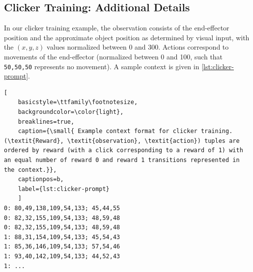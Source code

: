 \documentclass{article}
\renewcommand{\tt}[1]{{\texttt{#1}}}
\begin{document}
\subsection{Clicker Training: Additional Details}
In our clicker training example, the observation consists of the end-effector position and the approximate object position as determined by visual input, with the $(x,y,z)$ values normalized between 0 and 300. Actions correspond to movements of the end-effector (normalized between 0 and 100, such that \tt{50,50,50} represents no movement). A sample context is given in \cref{lst:clicker-prompt}.
\begin{lstlisting}[
    basicstyle=\ttfamily\footnotesize,
    backgroundcolor=\color{light},
    breaklines=true,
    caption={\small{ Example context format for clicker training. (\textit{Reward}, \textit{observation}, \textit{action}) tuples are ordered by reward (with a click corresponding to a reward of 1) with an equal number of reward 0 and reward 1 transitions represented in the context.}},
    captionpos=b,
    label={lst:clicker-prompt}
    ]
0: 80,49,138,109,54,133; 45,44,55
0: 82,32,155,109,54,133; 48,59,48
0: 82,32,155,109,54,133; 48,59,48
1: 88,31,154,109,54,133; 45,54,43
1: 85,36,146,109,54,133; 57,54,46
1: 93,40,142,109,54,133; 44,52,43
1: ...
\end{lstlisting}
\end{document}
